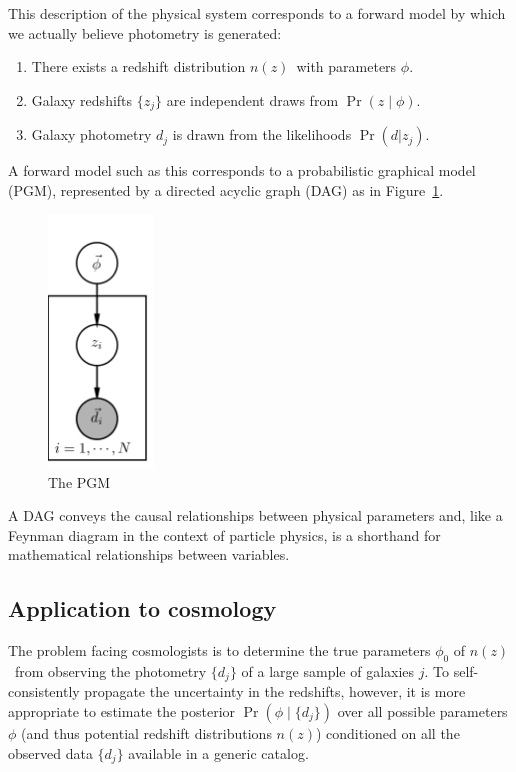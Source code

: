 \documentclass[iop]{emulateapj}
\newcommand{\nz}{$n(z)$}
\begin{document}
This description of the physical system corresponds to a forward model by which 
we actually believe photometry is generated:
\begin{enumerate}
	\item There exists a redshift distribution \nz\ with parameters $\phi$.
	\item Galaxy redshifts $\{z_{j}\}$ are independent draws from $\Pr(z 
\mid \phi)$.
	\item Galaxy photometry $d_{j}$ is drawn from the likelihoods $\Pr(d | 
z_{j})$.
\end{enumerate}
A forward model such as this corresponds to a probabilistic graphical model 
(PGM), represented by a directed acyclic graph (DAG) as in Figure~\ref{fig:pgm}.
\begin{figure}
	\begin{center}
		\includegraphics[width=0.25\textwidth]{fig/pgm.png}
		\caption{The PGM}
		\label{fig:pgm}
	\end{center}
\end{figure}
A DAG conveys the causal relationships between physical parameters and, like a 
Feynman diagram in the context of particle physics, is a shorthand for 
mathematical relationships between variables.

\subsection{Application to cosmology}
\label{sec:application}

The problem facing cosmologists is to determine the true parameters $\phi_{0}$ 
of \nz\ from observing the photometry $\{d_{j}\}$ of a large sample of galaxies 
$j$.
To self-consistently propagate the uncertainty in the redshifts, however, it is 
more appropriate to estimate the posterior $\Pr(\phi \mid \{d_{j}\})$ over all 
possible parameters $\phi$ (and thus potential redshift distributions \nz ) 
conditioned on all the observed data $\{d_{j}\}$ available in a generic catalog.
\end{document}
